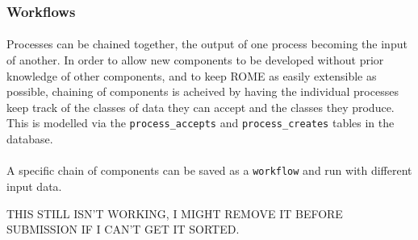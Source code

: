 \subsubsection{Workflows}
\label{sec:workflow}

\paragraph{}
Processes can be chained together, the output of one process becoming the input of another. In order to allow new components to be developed without prior knowledge of other components, and to keep ROME as easily extensible as possible, chaining of components is acheived by having the individual processes keep track of the classes of data they can accept and the classes they produce. This is modelled via the \texttt{process\_accepts} and \texttt{process\_creates} tables in the database. 

\paragraph{}
A specific chain of components can be saved as a \texttt{workflow} and run with different input data. 

THIS STILL ISN'T WORKING, I MIGHT REMOVE IT BEFORE SUBMISSION IF I CAN'T GET IT SORTED.